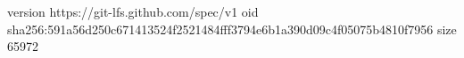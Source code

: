 version https://git-lfs.github.com/spec/v1
oid sha256:591a56d250c671413524f2521484fff3794e6b1a390d09c4f05075b4810f7956
size 65972
